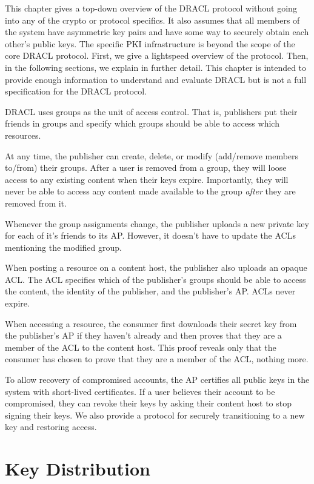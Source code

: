 \documentclass[pdftex,12pt,a4papaer]{report}
\begin{document}
This chapter gives a top-down overview of the DRACL protocol without going into
any of the crypto or protocol specifics. It also assumes that all members of the
system have asymmetric key pairs and have some way to securely obtain each
other's public keys. The specific PKI infrastructure is beyond the scope of the
core DRACL protocol. First, we give a lightspeed overview of the protocol. Then,
in the following sections, we explain in further detail. This chapter is
intended to provide enough information to understand and evaluate DRACL but is
not a full specification for the DRACL protocol.

DRACL uses groups as the unit of access control. That is, publishers put their
friends in groups and specify which groups should be able to access which
resources.

At any time, the publisher can create, delete, or modify (add/remove members
to/from) their groups. After a user is removed from a group, they will loose
access to any existing content when their keys expire. Importantly, they will
never be able to access any content made available to the group \emph{after}
they are removed from it.
  
Whenever the group assignments change, the publisher uploads a new private key
for each of it's friends to its AP. However, it doesn't have to update the ACLs
mentioning the modified group.
  
When posting a resource on a content host, the publisher also uploads an opaque
ACL. The ACL specifies which of the publisher's groups should be able to access
the content, the identity of the publisher, and the publisher's AP. ACLs never
expire.
  
When accessing a resource, the consumer first downloads their secret key from
the publisher's AP if they haven't already and then proves that they are a
member of the ACL to the content host. This proof reveals only that the consumer
has chosen to prove that they are a member of the ACL, nothing more.
  
To allow recovery of compromised accounts, the AP certifies all public keys in
the system with short-lived certificates. If a user believes their account to be
compromised, they can revoke their keys by asking their content host to stop
signing their keys. We also provide a protocol for securely transitioning to a
new key and restoring access.

\section{Key Distribution}
\end{document}
